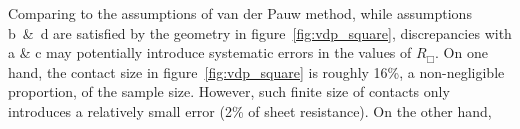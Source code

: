 Comparing to the assumptions of van der Pauw method, while assumptions b~\&~d are satisfied by the geometry in figure~\ref{fig:vdp_square}, discrepancies with a \& c may potentially introduce systematic errors in the values of $R_\Box$. On one hand, the contact size in figure~\ref{fig:vdp_square} is roughly 16\%, a non-negligible proportion, of the sample size. However, such finite size of contacts only introduces a relatively small error (2\% of sheet resistance). On the other hand, 